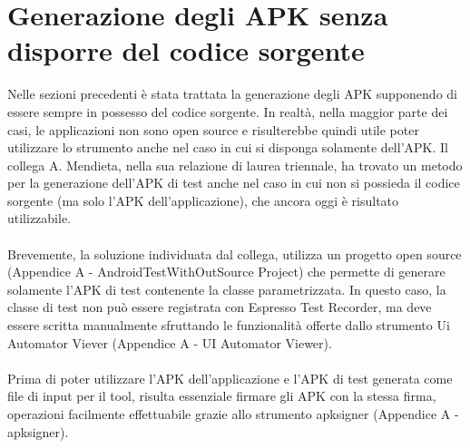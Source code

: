 \section{Generazione degli APK senza disporre del codice sorgente}
\label{genapknocod}
Nelle sezioni precedenti è stata trattata la generazione degli APK supponendo di essere sempre in possesso del codice sorgente. In realtà, nella maggior parte dei casi, le applicazioni non sono open source e risulterebbe quindi utile poter utilizzare lo strumento anche nel caso in cui si disponga solamente dell'APK.  Il collega A. Mendieta, nella sua relazione di laurea triennale, ha trovato un metodo per la generazione dell'APK di test anche nel caso in cui non si possieda il codice sorgente (ma solo l'APK dell'applicazione), che ancora oggi è risultato utilizzabile.
\\\\
\noindent Brevemente, la soluzione individuata dal collega, utilizza un progetto open source (Appendice A - AndroidTestWithOutSource Project) che permette di generare solamente l'APK di test contenente la classe parametrizzata. In questo caso, la classe di test non può essere registrata con Espresso Test Recorder, ma deve essere scritta manualmente sfruttando le funzionalità offerte dallo strumento Ui Automator Viever (Appendice A - UI Automator Viewer). 
\\\\
\noindent Prima di poter utilizzare l'APK dell'applicazione e l'APK di test generata come file di input per il tool, risulta essenziale firmare gli APK con la stessa firma, operazioni facilmente effettuabile grazie allo strumento apksigner (Appendice A - apksigner).

